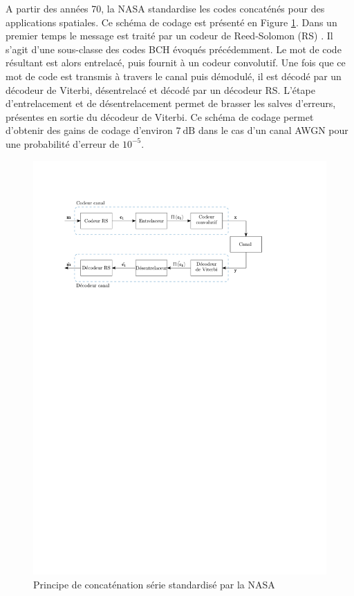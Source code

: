 A partir des années 70, la NASA standardise les codes concaténés pour des applications spatiales. Ce schéma de codage 
est présenté en Figure \ref{fig:nasa}. Dans un premier temps le message est traité par un codeur de Reed-Solomon (RS) \cite{RS}. 
Il s'agit d'une sous-classe des codes BCH évoqués précédemment. Le mot de code résultant est alors entrelacé, puis fournit à un 
codeur convolutif. Une fois que ce mot de code est transmis à travers le canal puis démodulé, il est décodé par un 
décodeur de Viterbi, désentrelacé et décodé par un décodeur RS. L'étape d'entrelacement et de désentrelacement 
permet de brasser les salves d'erreurs, présentes en sortie du décodeur de Viterbi. Ce schéma de codage permet d'obtenir 
des gains de codage d'environ $7~\text{dB}$ dans le cas d'un canal AWGN pour une probabilité d'erreur de $10^{-5}$.
\begin{figure}[!h]
	\centering
	\includegraphics[width=12cm]{main/ch1_fig/nasa.pdf}
	\caption{\label{fig:nasa} Principe de concaténation série standardisé par la NASA}
\end{figure}

